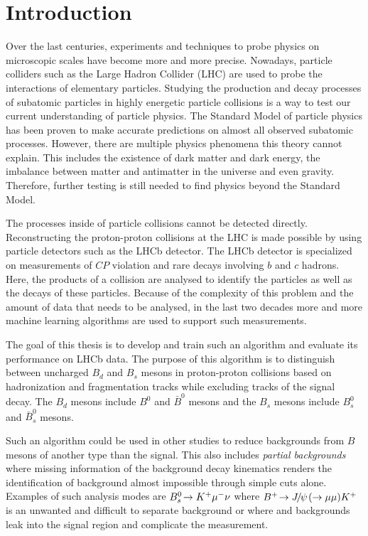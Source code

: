 \chapter{Introduction}

Over the last centuries, experiments and techniques to probe physics on microscopic scales have become more and more precise.
Nowadays, particle colliders such as the Large Hadron Collider (LHC) are used to probe the interactions of elementary particles.
Studying the production and decay processes of subatomic particles in highly energetic particle collisions is a way to test our current understanding of particle physics.
The Standard Model of particle physics has been proven to make accurate predictions on almost all observed subatomic processes.
However, there are multiple physics phenomena this theory cannot explain.
This includes the existence of dark matter and dark energy, the imbalance between matter and antimatter in the universe and even gravity.
Therefore, further testing is still needed to find physics beyond the Standard Model.

The processes inside of particle collisions cannot be detected directly.
Reconstructing the proton-proton collisions at the LHC is made possible by using particle detectors such as the LHCb detector.
The LHCb detector is specialized on measurements of $C\!P$ violation and rare decays involving $b$ and $c$ hadrons.
Here, the products of a collision are analysed to identify the particles as well as the decays of these particles.
Because of the complexity of this problem and the amount of data that needs to be analysed, in the last two decades more and more machine learning algorithms are used to support such measurements.

The goal of this thesis is to develop and train such an algorithm and evaluate its performance on LHCb data.
The purpose of this algorithm is to distinguish between uncharged $B_d$ and $B_s$ mesons in proton-proton collisions based on hadronization and fragmentation tracks while excluding tracks of the signal decay. The $B_d$ mesons include $B^0$ and $\bar{B}^0$ mesons and the $B_s$ mesons include $B_s^0$ and $\bar{B}_s^0$ mesons.

Such an algorithm could be used in other studies to reduce backgrounds from $B$ mesons of another type than the signal. 
This also includes \emph{partial backgrounds} where missing information of the background decay kinematics renders the identification of background almost impossible through simple cuts alone.
Examples of such analysis modes are $\mbox{\ensuremath{{{B}^0_{s}}\!\rightarrow {\ensuremath{{K}^+}}{\ensuremath{\mu^-}}{\ensuremath{\nu}}}}$ where $\mbox{\ensuremath{{{{B}^+}}\!\rightarrow {\ensuremath{{J\mskip -3mu/\mskip -2mu\psi\mskip 2mu}}}(\rightarrow{\ensuremath{\mu}}{\ensuremath{\mu}}){{K}^+}}}$ is an unwanted and difficult to separate background or \decay{\Bs}{\Dsp\Km} where \Bd and \Lb backgrounds leak into the signal region and complicate the measurement.



















